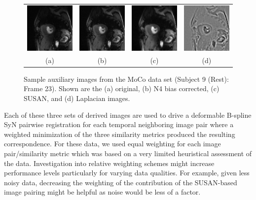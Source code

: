 \documentclass{llncs}
\begin{document}
\begin{figure}
\centering
  \begin{tabular}{cccc}
    \includegraphics[width=29.5mm]{Figures/MoCo_09_Rest_23_Original.png} &
    \includegraphics[width=29.5mm]{Figures/MoCo_09_Rest_23_N4.png} &
    \includegraphics[width=29.5mm]{Figures/MoCo_09_Rest_23_SUSAN.png} &
    \includegraphics[width=29.5mm]{Figures/MoCo_09_Rest_23_Laplacian.png} \\
    (a) & (b) &
    (c) & (d) \\
  \end{tabular}
  \caption{Sample auxiliary images from the MoCo data set (Subject 9 (Rest): Frame 23).
           Shown are the (a) original, (b) N4 bias corrected, (c) SUSAN, and (d) Laplacian
           images.}
  \label{fig:subject9}         
\end{figure}


Each of these three sets of derived images are used to drive a deformable B-spline SyN
pairwise registration for each temporal neighboring image pair where a weighted 
minimization of the three similarity metrics produced the resulting correspondence.
For these data, we used equal weighting for each image pair/similarity metric 
which was based on a very limited heuristical assessment of the data. Investigation into
relative weighting schemes might increase performance levels particularly for varying
data qualities.  For example, given less noisy data, decreasing the weighting of the 
contribution of the SUSAN-based image pairing might be helpful as noise would be less of
a factor.
\end{document}
